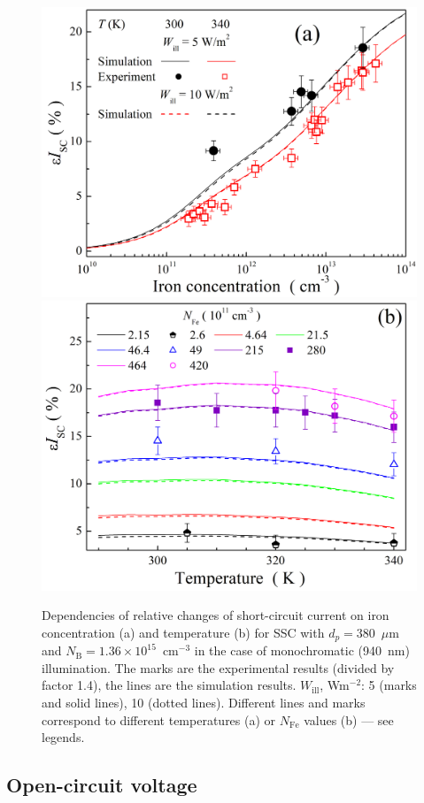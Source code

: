 \documentclass[a4paper,fleqn]{cas-sc}
\begin{document}
\begin{figure}
	\centering
     \includegraphics[width=0.4\linewidth]{Fig5a.png}
     \includegraphics[width=0.4\linewidth]{Fig5b.png}
	  \caption{Dependencies of relative changes of short-circuit current on iron concentration (a) and
       temperature (b) for SSC with $d_p=380$~$\mu$m and $N_\mathrm{B}=1.36\times10^{15}$~cm$^{-3}$
       in the case of monochromatic (940~nm) illumination.
       The marks are the experimental results (divided by factor 1.4), the lines are the simulation results.
       $W_\mathrm{ill}$, Wm$^{-2}$: 5 (marks and solid lines), 10 (dotted lines).
       Different lines and marks correspond to different temperatures (a) or $N_\mathrm{Fe}$ values (b) --- see legends.
}\label{fig5}
\end{figure}

\subsection{Open-circuit voltage}
\end{document}
